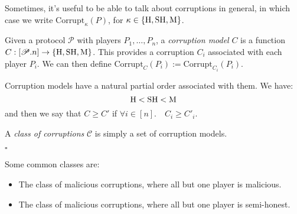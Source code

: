 Sometimes, it's useful to be able to talk about corruptions in general,
in which case we write $\text{Corrupt}_\kappa(P)$,
for $\kappa \in \{\text{H}, \text{SH}, \text{M}\}$.

\begin{definition}
Given a protocol $\mathscr{P}$ with players $P_1, \ldots, P_n$, a \emph{corruption model} $C$
is a function $C : [\mathscr{P}.n] \to \{\text{H}, \text{SH}, \text{M}\}$.
This provides a corruption $C_i$ associated with each player $P_i$.
We can then define $\text{Corrupt}_C(P_i) := \text{Corrupt}_{C_i}(P_i)$.

Corruption models have a natural partial order associated with them. 
We have:
$$
\text{H} < \text{SH} < \text{M}
$$
  and then we say that $C \geq C'$ if $\forall i \in [n]. \quad C_i \geq C'_i$.

A \emph{class of corruptions} $\mathscr{C}$ is simply a set of corruption models.

$\square$
\end{definition}

Some common classes are:
\begin{itemize}
  \item The class of malicious corruptions, where all but one player is malicious.
  \item The class of malicious corruptions, where all but one player is semi-honest.
\end{itemize}

